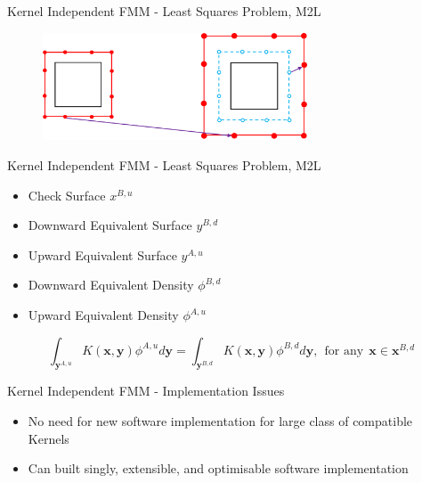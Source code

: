 \begin{frame}{Kernel Independent FMM - Least Squares Problem, M2L}

    \begin{figure}
        \centering
        \includegraphics[width=0.7\textwidth]{assets/kifmm_m2l.png}
        \vspace{50pt}
    \end{figure}
\end{frame}

\begin{frame}{Kernel Independent FMM - Least Squares Problem, M2L}
    \begin{itemize}
        \item Check Surface $x^{B, u}$
        \item Downward Equivalent Surface $y^{B, d}$
        \item Upward Equivalent Surface $y^{A, u}$
        \item Downward Equivalent Density $\phi^{B, d}$
        \item Upward Equivalent Density $\phi^{A, u}$
    \end{itemize}


    \begin{equation}
        \int_{\mathbf{y}^{A,u}} K(\mathbf{x}, \mathbf{y})\phi^{A, u} d\mathbf{y} =   \int_{\mathbf{y}^{B,d}} K(\mathbf{x}, \mathbf{y})\phi^{B, d} d\mathbf{y}, \> \> \text{for any} \> \> \mathbf{x} \in \mathbf{x}^{B, d}
    \end{equation}
\end{frame}

\begin{frame}{Kernel Independent FMM - Implementation Issues}
    \begin{itemize}
        \item No need for new software implementation for large class of compatible Kernels
        \item Can built singly, extensible, and optimisable software implementation
    \end{itemize}
\end{frame}